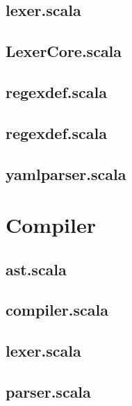 \subsection{lexer.scala}

\subsection{LexerCore.scala}

\subsection{regexdef.scala}

\subsection{regexdef.scala}

\subsection{yamlparser.scala}


\section{Compiler}
\subsection{ast.scala}

\subsection{compiler.scala}

\subsection{lexer.scala}

\subsection{parser.scala}


